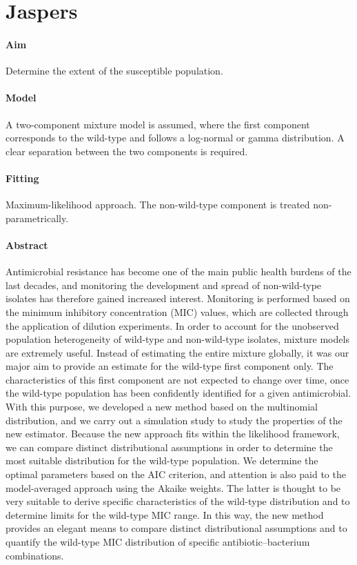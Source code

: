 \documentclass[a4paper]{article}
\begin{document}
\section{Jaspers \cite{Jaspers2014a}}
\paragraph{Aim} Determine the extent of the susceptible population.
\paragraph{Model} A two-component mixture model is assumed, where the first component corresponds to the wild-type and follows a log-normal or gamma distribution. A clear separation between the two components is required.
\paragraph{Fitting} Maximum-likelihood approach. The non-wild-type component is treated non-parametrically.
\paragraph{Abstract} Antimicrobial resistance has become one of the main public health burdens of the last decades, and monitoring the development and spread of non-wild-type isolates has therefore gained increased interest. Monitoring is performed based on the minimum inhibitory concentration (MIC) values, which are collected through the application of dilution experiments. In order to account for the unobserved population heterogeneity of wild-type and non-wild-type isolates, mixture models are extremely useful. Instead of estimating the entire mixture globally, it was our major aim to provide an estimate for the wild-type first component only. The characteristics of this first component are not expected to change over time, once the wild-type population has been confidently identified for a given antimicrobial. With this purpose, we developed a new method based on the multinomial distribution, and we carry out a simulation study to study the properties of the new estimator. Because the new approach fits within the likelihood framework, we can compare distinct distributional assumptions in order to determine the most suitable distribution for the wild-type population. We determine the optimal parameters based on the AIC criterion, and attention is also paid to the model-averaged approach using the Akaike weights. The latter is thought to be very suitable to derive specific characteristics of the wild-type distribution and to determine limits for the wild-type MIC range. In this way, the new method provides an elegant means to compare distinct distributional assumptions and to quantify the wild-type MIC distribution of specific antibiotic–bacterium combinations.
\end{document}
